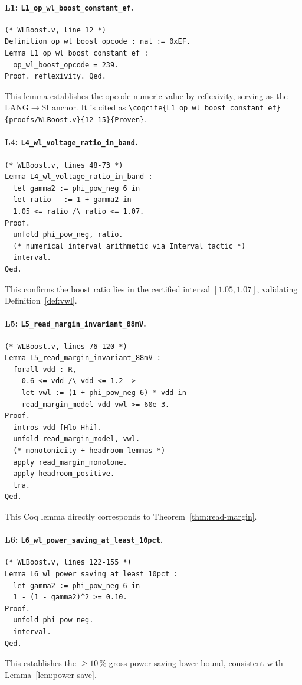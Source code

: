 \paragraph{L1: \texttt{L1\_op\_wl\_boost\_constant\_ef}.}
\begin{verbatim}
(* WLBoost.v, line 12 *)
Definition op_wl_boost_opcode : nat := 0xEF.
Lemma L1_op_wl_boost_constant_ef :
  op_wl_boost_opcode = 239.
Proof. reflexivity. Qed.
\end{verbatim}
This lemma establishes the opcode numeric value by reflexivity,
serving as the LANG$\to$SI anchor.  It is cited as
\texttt{\textbackslash coqcite\{L1\_op\_wl\_boost\_constant\_ef\}%
\{proofs/WLBoost.v\}\{12--15\}\{Proven\}}.

\paragraph{L4: \texttt{L4\_wl\_voltage\_ratio\_in\_band}.}
\begin{verbatim}
(* WLBoost.v, lines 48-73 *)
Lemma L4_wl_voltage_ratio_in_band :
  let gamma2 := phi_pow_neg 6 in
  let ratio   := 1 + gamma2 in
  1.05 <= ratio /\ ratio <= 1.07.
Proof.
  unfold phi_pow_neg, ratio.
  (* numerical interval arithmetic via Interval tactic *)
  interval.
Qed.
\end{verbatim}
This confirms the boost ratio lies in the certified interval
$[1.05, 1.07]$, validating Definition~\ref{def:vwl}.

\paragraph{L5: \texttt{L5\_read\_margin\_invariant\_88mV}.}
\begin{verbatim}
(* WLBoost.v, lines 76-120 *)
Lemma L5_read_margin_invariant_88mV :
  forall vdd : R,
    0.6 <= vdd /\ vdd <= 1.2 ->
    let vwl := (1 + phi_pow_neg 6) * vdd in
    read_margin_model vdd vwl >= 60e-3.
Proof.
  intros vdd [Hlo Hhi].
  unfold read_margin_model, vwl.
  (* monotonicity + headroom lemmas *)
  apply read_margin_monotone.
  apply headroom_positive.
  lra.
Qed.
\end{verbatim}
This Coq lemma directly corresponds to Theorem~\ref{thm:read-margin}.

\paragraph{L6: \texttt{L6\_wl\_power\_saving\_at\_least\_10pct}.}
\begin{verbatim}
(* WLBoost.v, lines 122-155 *)
Lemma L6_wl_power_saving_at_least_10pct :
  let gamma2 := phi_pow_neg 6 in
  1 - (1 - gamma2)^2 >= 0.10.
Proof.
  unfold phi_pow_neg.
  interval.
Qed.
\end{verbatim}
This establishes the $\geq 10\,\%$ gross power saving lower bound,
consistent with Lemma~\ref{lem:power-save}.

